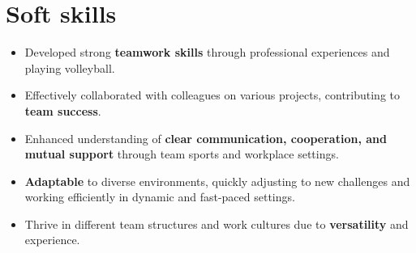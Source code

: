 \documentclass[a4paper,10pt]{article}
\begin{document}
\begin{minipage}[t]{0.25\textwidth}
    \section*{Soft skills}

\end{minipage}
\hfill
\begin{minipage}[t]{0.75\textwidth}
        \begin{itemize}[leftmargin=1cm]
        \item Developed strong \textbf{teamwork skills} through professional experiences and playing volleyball.
        \item Effectively collaborated with colleagues on various projects, contributing to \textbf{team success}.
        \item Enhanced understanding of \textbf{clear communication, cooperation, and mutual support} through team sports and workplace settings.
        \item \textbf{Adaptable} to diverse environments, quickly adjusting to new challenges and working efficiently in dynamic and fast-paced settings.
        \item Thrive in different team structures and work cultures due to \textbf{versatility} and experience.
    \end{itemize}
\end{minipage}
\end{document}
